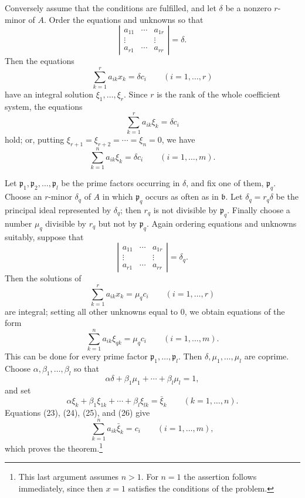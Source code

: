 \documentclass[11pt,a4paper]{article}
\begin{document}
Conversely assume that the conditions are fulfilled, and let \(\delta\) be a nonzero \(r\)-minor of \(A\). Order the equations and unknowns so that
\[
 \left|\begin{array}{ccc}
 a_{11}&\cdots&a_{1r}\\
 \vdots&&\vdots\\
 a_{r1}&\cdots&a_{rr}
 \end{array}\right|=\delta .
\]
Then the equations
\[
 \sum_{k=1}^{r}a_{ik}x_k=\delta c_i\qquad(i=1,\ldots,r)
\]
have an integral solution \(\xi_1,\ldots,\xi_r\). Since \(r\) is the rank of the whole coefficient system, the equations
\[
 \sum_{k=1}^{r}a_{ik}\xi_k=\delta c_i
\]
hold; or, putting \(\xi_{r+1}=\xi_{r+2}=\cdots=\xi_n=0\), we have
\[
 \sum_{k=1}^{n}a_{ik}\xi_k=\delta c_i\qquad(i=1,\ldots,m). \tag{23}
\]

Let \(\mathfrak p_1,\mathfrak p_2,\ldots,\mathfrak p_l\) be the prime factors occurring in \(\delta\), and fix one of them, \(\mathfrak p_q\). Choose an \(r\)-minor \(\delta_q\) of \(A\) in which \(\mathfrak p_q\) occurs as often as in \(\mathfrak b\). Let \(\delta_q=r_q\delta\) be the principal ideal represented by \(\delta_q\); then \(r_q\) is not divisible by \(\mathfrak p_q\). Finally choose a number \(\mu_q\) divisible by \(r_q\) but not by \(\mathfrak p_q\). Again ordering equations and unknowns suitably, suppose that
\[
 \left|\begin{array}{ccc}
 a_{11}&\cdots&a_{1r}\\
 \vdots&&\vdots\\
 a_{r1}&\cdots&a_{rr}
 \end{array}\right|=\delta_q .
\]
Then the solutions of
\[
 \sum_{k=1}^{r}a_{ik}x_k=\mu_q c_i\qquad(i=1,\ldots,r)
\]
are integral; setting all other unknowns equal to \(0\), we obtain equations of the form
\[
 \sum_{k=1}^{n}a_{ik}\xi_{qk}=\mu_q c_i\qquad(i=1,\ldots,m). \tag{24}
\]
This can be done for every prime factor \(\mathfrak p_1,\ldots,\mathfrak p_l\). Then \(\delta,\mu_1,\ldots,\mu_l\) are coprime. Choose \(\alpha,\beta_1,\ldots,\beta_l\) so that
\[
 \alpha\delta+\beta_1\mu_1+\cdots+\beta_l\mu_l=1, \tag{25}
\]
and set
\[
 \alpha\xi_k+\beta_1\xi_{1k}+\cdots+\beta_l\xi_{lk}=\bar\xi_k
 \qquad(k=1,\ldots,n). \tag{26}
\]
Equations (23), (24), (25), and (26) give
\[
 \sum_{k=1}^{n}a_{ik}\bar\xi_k=c_i\qquad(i=1,\ldots,m), \tag{27}
\]
which proves the theorem.\footnote{This last argument assumes \(n>1\). For \(n=1\) the assertion follows immediately, since then \(x=1\) satisfies the conditions of the problem.}
\end{document}
